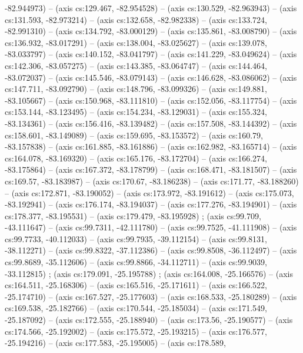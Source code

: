   -82.944973) -- (axis cs:129.467, -82.954528) -- (axis cs:130.529,
  -82.963943) -- (axis cs:131.593, -82.973214) -- (axis cs:132.658,
  -82.982338) -- (axis cs:133.724, -82.991310) -- (axis cs:134.792,
  -83.000129) -- (axis cs:135.861, -83.008790) -- (axis cs:136.932,
  -83.017291) -- (axis cs:138.004, -83.025627) -- (axis cs:139.078,
  -83.033797) -- (axis cs:140.152, -83.041797) -- (axis cs:141.229,
  -83.049624) -- (axis cs:142.306, -83.057275) -- (axis cs:143.385,
  -83.064747) -- (axis cs:144.464, -83.072037) -- (axis cs:145.546,
  -83.079143) -- (axis cs:146.628, -83.086062) -- (axis cs:147.711,
  -83.092790) -- (axis cs:148.796, -83.099326) -- (axis cs:149.881,
  -83.105667) -- (axis cs:150.968, -83.111810) -- (axis cs:152.056,
  -83.117754) -- (axis cs:153.144, -83.123495) -- (axis cs:154.234,
  -83.129031) -- (axis cs:155.324, -83.134361) -- (axis cs:156.416,
  -83.139482) -- (axis cs:157.508, -83.144392) -- (axis cs:158.601,
  -83.149089) -- (axis cs:159.695, -83.153572) -- (axis cs:160.79, -83.157838)
  -- (axis cs:161.885, -83.161886) -- (axis cs:162.982, -83.165714) -- (axis
  cs:164.078, -83.169320) -- (axis cs:165.176, -83.172704) -- (axis
  cs:166.274, -83.175864) -- (axis cs:167.372, -83.178799) -- (axis
  cs:168.471, -83.181507) -- (axis cs:169.57, -83.183987) -- (axis cs:170.67,
  -83.186238) -- (axis cs:171.77, -83.188260) -- (axis cs:172.871, -83.190052)
  -- (axis cs:173.972, -83.191612) -- (axis cs:175.073, -83.192941) -- (axis
  cs:176.174, -83.194037) -- (axis cs:177.276, -83.194901) -- (axis
  cs:178.377, -83.195531) -- (axis cs:179.479, -83.195928)
  ;  (axis cs:99.709, -43.111647) -- (axis
  cs:99.7311, -42.111780) -- (axis cs:99.7525, -41.111908) -- (axis
  cs:99.7733, -40.112033) -- (axis cs:99.7935, -39.112154) -- (axis
  cs:99.8131, -38.112271) -- (axis cs:99.8322, -37.112386) -- (axis
  cs:99.8508, -36.112497) -- (axis cs:99.8689, -35.112606) -- (axis
  cs:99.8866, -34.112711) -- (axis cs:99.9039, -33.112815)
  ;  (axis cs:179.091, -25.195788)
  ;  (axis cs:164.008, -25.166576) -- (axis
  cs:164.511, -25.168306) -- (axis cs:165.516, -25.171611) -- (axis
  cs:166.522, -25.174710) -- (axis cs:167.527, -25.177603) -- (axis
  cs:168.533, -25.180289) -- (axis cs:169.538, -25.182766) -- (axis
  cs:170.544, -25.185034) -- (axis cs:171.549, -25.187092) -- (axis
  cs:172.555, -25.188940) -- (axis cs:173.56, -25.190577) -- (axis cs:174.566,
  -25.192002) -- (axis cs:175.572, -25.193215) -- (axis cs:176.577,
  -25.194216) -- (axis cs:177.583, -25.195005) -- (axis cs:178.589,
